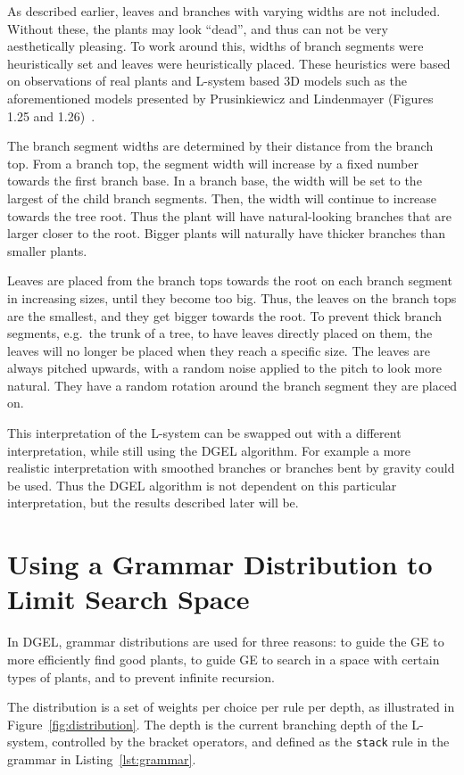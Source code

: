 As described earlier, leaves and branches with varying widths are not included.
Without these, the plants may look ``dead'', and thus can not be very aesthetically pleasing.
To work around this, widths of branch segments were heuristically set and leaves were heuristically placed.
These heuristics were based on observations of real plants and \gls{L-system} based 3D models such as the aforementioned models presented by Prusinkiewicz and Lindenmayer (Figures 1.25 and 1.26)~\cite{2012Prusinkiewicz}.

The branch segment widths are determined by their distance from the branch top.
From a branch top, the segment width will increase by a fixed number towards the first branch base.
In a branch base, the width will be set to the largest of the child branch segments.
Then, the width will continue to increase towards the tree root.
Thus the plant will have natural-looking branches that are larger closer to the root.
Bigger plants will naturally have thicker branches than smaller plants.

Leaves are placed from the branch tops towards the root on each branch segment in increasing sizes, until they become too big.
Thus, the leaves on the branch tops are the smallest, and they get bigger towards the root.
To prevent thick branch segments, e.g.\ the trunk of a tree, to have leaves directly placed on them, the leaves will no longer be placed when they reach a specific size.
The leaves are always pitched upwards, with a random noise applied to the pitch to look more natural.
They have a random rotation around the branch segment they are placed on.

This interpretation of the \gls{L-system} can be swapped out with a different interpretation, while still using the \gls{DGEL} algorithm.
For example a more realistic interpretation with smoothed branches or branches bent by gravity could be used.
Thus the \gls{DGEL} algorithm is not dependent on this particular interpretation, but the results described later will be.

\section{Using a Grammar Distribution to Limit Search Space}
In \gls{DGEL}, grammar distributions are used for three reasons: to guide the \gls{GE} to more efficiently find good plants, to guide \gls{GE} to search in a space with certain types of plants, and to prevent infinite recursion.

The distribution is a set of weights per choice per rule per depth, as illustrated in Figure~\ref{fig:distribution}.
The depth is the current branching depth of the \gls{L-system}, controlled by the bracket operators, and defined as the \texttt{stack} rule in the grammar in Listing~\ref{lst:grammar}.

